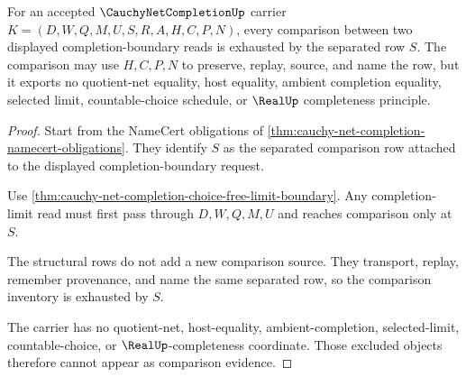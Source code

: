 \begin{theorem}
\label{thm:cauchy-net-completion-separated-comparison-exhaustion}
For an accepted $\CauchyNetCompletionUp$ carrier $K=(D,W,Q,M,U,S,R,A,H,C,P,N)$, every comparison between two displayed completion-boundary reads is exhausted by the separated row $S$. The comparison may use $H,C,P,N$ to preserve, replay, source, and name the row, but it exports no quotient-net equality, host equality, ambient completion equality, selected limit, countable-choice schedule, or $\RealUp$ completeness principle.
\end{theorem}
\begin{proof}
Start from the NameCert obligations of \autoref{thm:cauchy-net-completion-namecert-obligations}. They identify $S$ as the separated comparison row attached to the displayed completion-boundary request.

Use \autoref{thm:cauchy-net-completion-choice-free-limit-boundary}. Any completion-limit read must first pass through $D,W,Q,M,U$ and reaches comparison only at $S$.

The structural rows do not add a new comparison source. They transport, replay, remember provenance, and name the same separated row, so the comparison inventory is exhausted by $S$.

The carrier has no quotient-net, host-equality, ambient-completion, selected-limit, countable-choice, or $\RealUp$-completeness coordinate. Those excluded objects therefore cannot appear as comparison evidence.
\end{proof}

